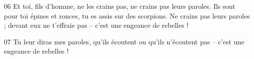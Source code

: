 
06 Et toi, fils d’homme, ne les crains pas, ne crains pas leurs paroles. Ils sont pour toi épines et ronces, tu es assis sur des scorpions. Ne crains pas leurs paroles ; devant eux ne t’effraie pas – c’est une engeance de rebelles !

07 Tu leur diras mes paroles, qu’ils écoutent ou qu’ils n’écoutent pas – c’est une engeance de rebelles !
